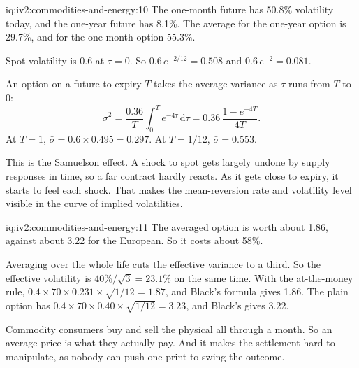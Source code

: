 \begin{solution}{iq:iv2:commodities-and-energy:10}
The one-month future has 50.8\% volatility today, and the one-year future has 8.1\%. The average for the one-year option is 29.7\%, and for the one-month option 55.3\%.

Spot volatility is $0.6$ at $\tau = 0$. So $0.6\,e^{-2/12} = 0.508$ and $0.6\,e^{-2} = 0.081$.

An option on a future to expiry $T$ takes the average variance as $\tau$ runs from $T$ to 0:
\[
\bar\sigma^2 = \frac{0.36}{T}\int_0^T e^{-4\tau}\,\mathrm{d}\tau = 0.36\,\frac{1 - e^{-4T}}{4T}.
\]
At $T = 1$, $\bar\sigma = 0.6 \times 0.495 = 0.297$. At $T = 1/12$, $\bar\sigma = 0.553$.

This is the Samuelson effect. A shock to spot gets largely undone by supply responses in time, so a far contract hardly reacts. As it gets close to expiry, it starts to feel each shock. That makes the mean-reversion rate and volatility level visible in the curve of implied volatilities.

\end{solution}

\begin{solution}{iq:iv2:commodities-and-energy:11}
The averaged option is worth about 1.86, against about 3.22 for the European. So it costs about 58\%.

Averaging over the whole life cuts the effective variance to a third. So the effective volatility is $40\%/\sqrt{3} = 23.1\%$ on the same time. With the at-the-money rule, $0.4 \times 70 \times 0.231 \times \sqrt{1/12} = 1.87$, and Black's formula gives 1.86. The plain option has $0.4 \times 70 \times 0.40 \times \sqrt{1/12} = 3.23$, and Black's gives 3.22.

Commodity consumers buy and sell the physical all through a month. So an average price is what they actually pay. And it makes the settlement hard to manipulate, as nobody can push one print to swing the outcome.

\end{solution}

